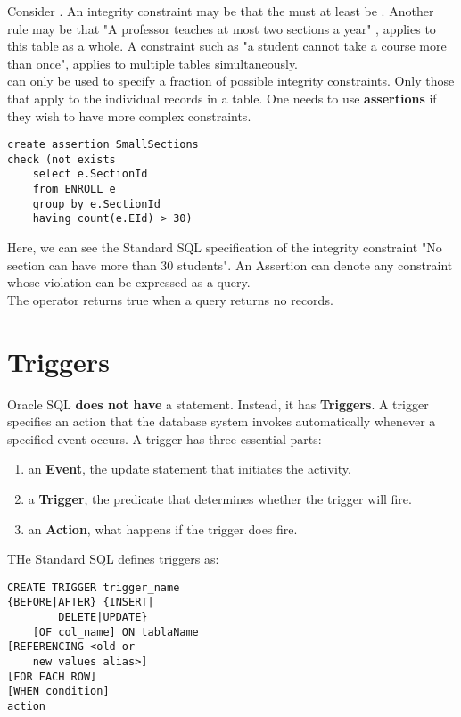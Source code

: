 \documentclass[11pt,a4paper,twocolumn]{book}
\begin{document}
Consider . An integrity constraint may be that the  must at least be . Another rule may be that "A professor teaches at most two sections a year" , applies to this table as a whole. A constraint such as "a student cannot take a course more than once", applies to multiple tables simultaneously.\\

 can only be used to specify a fraction of possible integrity constraints. Only those that apply to the individual records in a table. One needs to use \textbf{assertions} if they wish to have more complex constraints.

\begin{lstlisting}
create assertion SmallSections
check (not exists
	select e.SectionId
	from ENROLL e
	group by e.SectionId
	having count(e.EId) > 30)
\end{lstlisting}

Here, we can see the Standard SQL specification of the integrity constraint "No section can have more than 30 students". An Assertion can denote any constraint whose violation can be expressed as a query.\\

The  operator returns true when a query returns no records.\\

\section{Triggers}

Oracle SQL \textbf{does not have} a  statement. Instead, it has \textbf{Triggers}. A trigger specifies an action that the database system invokes automatically whenever a specified event occurs. A trigger has three essential parts:

\begin{enumerate}
\item an \textbf{Event}, the update statement that initiates the activity.
\item a \textbf{Trigger}, the predicate that determines whether the trigger will fire.
\item an \textbf{Action}, what happens if the trigger does fire.
\end{enumerate}


THe Standard SQL defines triggers as:

\begin{lstlisting}
CREATE TRIGGER trigger_name
{BEFORE|AFTER} {INSERT|
		DELETE|UPDATE}
	[OF col_name] ON tablaName
[REFERENCING <old or 
	new values alias>]
[FOR EACH ROW]
[WHEN condition]
action
\end{lstlisting}
\end{document}
